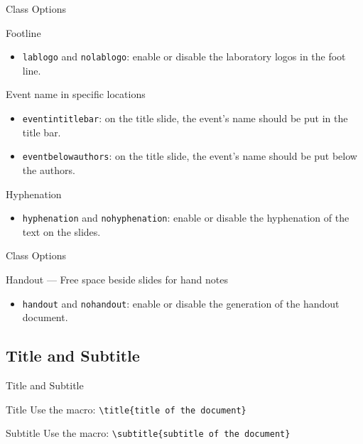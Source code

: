 \documentclass[english,sectioncirclenumberstyle]{le2iutbmbeamer}
\begin{document}
\begin{frame}[t]{Class Options \insertcontinuationtext}
	\begin{block}{Footline}
		\begin{itemize}
		\item \texttt{lablogo} and \texttt{nolablogo}: enable or disable the laboratory logos in the foot line.
		\end{itemize}
	\end{block}
	\begin{block}{Event name in specific locations}
		\begin{itemize}
		\item \texttt{eventintitlebar}: on the title slide, the event's name should be put in the title bar.
		\item \texttt{eventbelowauthors}: on the title slide, the event's name should be put below the authors.
		\end{itemize}
	\end{block}
	\begin{block}{Hyphenation}
		\begin{itemize}
		\item \texttt{hyphenation} and \texttt{nohyphenation}: enable or disable the hyphenation of the text on the slides.
		\end{itemize}
	\end{block}
\end{frame}

\begin{frame}[t]{Class Options \insertcontinuationtext}
	\begin{block}{Handout --- Free space beside slides for hand notes}
		\begin{itemize}
		\item \texttt{handout} and \texttt{nohandout}: enable or disable the generation of the handout document.
		\end{itemize}
	\end{block}
\end{frame}

\subsection{Title and Subtitle}

\begin{frame}{Title and Subtitle}
	\begin{block}{Title}
		Use the macro: \texttt{{\textbackslash}title\{title of the document\}}
	\end{block}
	\vfill
	\begin{block}{Subtitle}
		Use the macro: \texttt{{\textbackslash}subtitle\{subtitle of the document\}}
	\end{block}
	\vfill
\end{frame}
\end{document}
